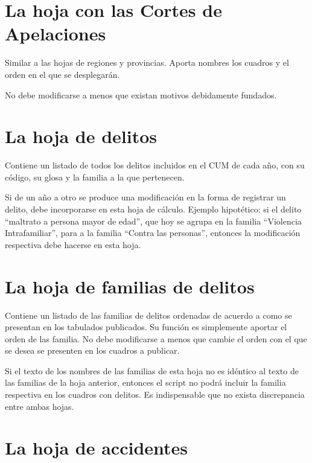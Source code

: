 \documentclass[
  spanish,
]{book}
\begin{document}
\hypertarget{la-hoja-con-las-cortes-de-apelaciones}{%
\section{La hoja con las Cortes de Apelaciones}\label{la-hoja-con-las-cortes-de-apelaciones}}

Similar a las hojas de regiones y provincias. Aporta nombres los cuadros y el orden en el que se desplegarán.

No debe modificarse a menos que existan motivos debidamente fundados.

\hypertarget{la-hoja-de-delitos}{%
\section{La hoja de delitos}\label{la-hoja-de-delitos}}

Contiene un listado de todos los delitos incluidos en el CUM de cada año, con su código, su glosa y la familia a la que pertenecen.

Si de un año a otro se produce una modificación en la forma de registrar un delito, debe incorporarse en esta hoja de cálculo. Ejemplo hipotético: si el delito ``maltrato a persona mayor de edad'', que hoy se agrupa en la familia ``Violencia Intrafamiliar'', para a la familia ``Contra las personas'', entonces la modificación respectiva debe hacerse en esta hoja.

\hypertarget{la-hoja-de-familias-de-delitos}{%
\section{La hoja de familias de delitos}\label{la-hoja-de-familias-de-delitos}}

Contiene un listado de las familias de delitos ordenadas de acuerdo a como se presentan en los tabulados publicados. Su función es simplemente aportar el orden de las familia. No debe modificarse a menos que cambie el orden con el que se desea se presenten en los cuadros a publicar.

Si el texto de los nombres de las familias de esta hoja no es idéntico al texto de las familias de la hoja anterior, entonces el script no podrá incluir la familia respectiva en los cuadros con delitos. Es indispensable que no exista discrepancia entre ambas hojas.

\hypertarget{la-hoja-de-accidentes}{%
\section{La hoja de accidentes}\label{la-hoja-de-accidentes}}
\end{document}

